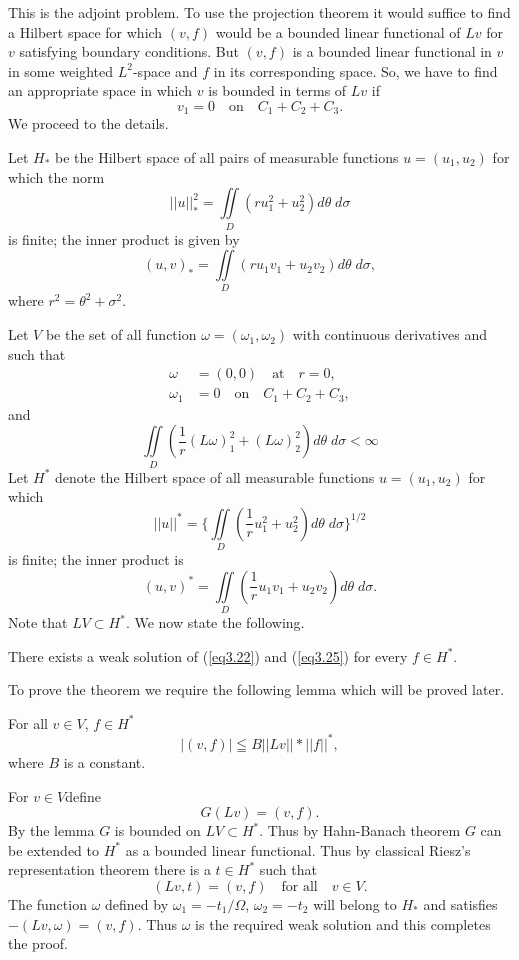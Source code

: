 This is the adjoint problem. To use the projection theorem it would suffice to find a Hilbert space for which $(v,f)$ would be a bounded linear functional of $Lv$ for $v$ satisfying boundary conditions. But $(v,f)$ is a bounded linear functional in $v$ in some weighted $L^2$-space and $f$ in its corresponding space. So, we have to find an appropriate space in which $v$ is bounded in terms of $Lv$ if 
\begin{equation*}
v_1 = 0 \quad \text{on}\quad C_1 + C_2 + C_3. 
\tag{3.27}\label{eq3.27}
\end{equation*}
We proceed to the details.

Let $H_*$ be the Hilbert space of all pairs of measurable functions $u = (u_1, u_2)$ for which the norm
$$
|| u ||^2_* = \iint\limits_D (ru^2_1 + u^2_2) d \theta \; d\sigma
$$
is finite; the inner product is given by 
$$
(u,v)_* = \iint\limits_D (ru_1 v_1 + u_2 v_2) d \theta \; d\sigma,
$$\pageoriginale
where $r^2 = \theta^2 + \sigma^2$.

Let $V$ be the set of all function $\omega = (\omega_1, \omega_2)$ with continuous derivatives and such that
\begin{align*}
 \omega & = (0,0) \quad \text{at} \quad  r=0, \\
\omega_1 & = 0\quad \text{on} \quad C_1 + C_2 + C_3, 
\end{align*}
and 
$$
\iint\limits_D (\frac{1}{r} (L\omega)^2_1 + (L\omega)^2_2) d\theta \; d\sigma < \infty
$$
Let $H^*$ denote the Hilbert space of all measurable functions $u = (u_1, u_2)$ for which
$$
|| u ||^* = \{\iint\limits_D (\frac{1}{r} u^2_1 + u^2_2) d \theta \; d\sigma\}^{1/2}
$$
is finite; the inner product is
$$
(u,v)^* = \iint\limits_D (\frac{1}{r} u_1 v_1 + u_2 v_2) d\theta \; d\sigma. 
$$
Note that $LV \subset H^*$. We now state the following. 

\begin{theorem*}
There exists a weak solution of (\ref{eq3.22}) and (\ref{eq3.25}) for every $f \in H^*$. 

To prove the theorem we require the following lemma which will be proved later.
\end{theorem*}

\begin{lemma*}
For all $v \in V$, $f \in H^*$
$$
|(v,f)| \leqq B||Lv||*||f||^*,
$$
where $B$ is a constant. 
\end{lemma*}

\medskip
{}
For $v \in V$\pageoriginale define
$$
G(Lv) = (v,f).
$$
By the lemma $G$ is bounded on $LV \subset H^*$. Thus by Hahn-Banach theorem $G$ can be extended to $H^*$ as a bounded linear functional. Thus by classical Riesz's representation theorem there is a $t \in H^*$ such that 
$$
(Lv,t) = (v,f) \quad \text{for all}\quad v \in V. 
$$
The function $\omega$ defined by $\omega_1 = -t_1 /\Omega$, $\omega_2 = - t_2$ will belong to $H_*$ and satisfies $-(Lv, \omega) = (v,f)$. Thus $\omega$ is the required weak solution and this completes the proof.

